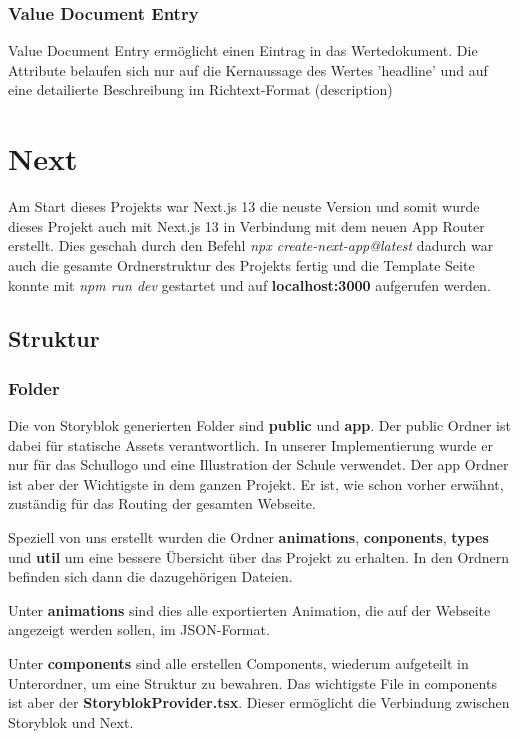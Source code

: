 \subsubsection*{Value Document Entry}
Value Document Entry ermöglicht einen Eintrag in das Wertedokument. Die Attribute belaufen sich nur auf die Kernaussage des Wertes 'headline' und auf eine detailierte Beschreibung im Richtext-Format (description) 

\section{Next}

Am Start dieses Projekts war Next.js 13 die neuste Version und somit wurde dieses Projekt auch mit Next.js 13 in Verbindung mit dem neuen App Router erstellt.
Dies geschah durch den Befehl \emph{npx create-next-app@latest} dadurch war auch die gesamte Ordnerstruktur des Projekts fertig und die Template Seite konnte mit \emph{npm run dev} gestartet und auf \textbf{localhost:3000} aufgerufen werden.

\subsection{Struktur}
\subsubsection*{Folder}
Die von Storyblok generierten Folder sind \textbf{public} und \textbf{app}. 
Der public Ordner ist dabei für statische Assets verantwortlich. In unserer Implementierung wurde er nur für das Schullogo und eine Illustration der Schule verwendet. 
Der app Ordner ist aber der Wichtigste in dem ganzen Projekt. Er ist, wie schon vorher erwähnt, zuständig für das Routing der gesamten Webseite. 


Speziell von uns erstellt wurden die Ordner \textbf{animations}, \textbf{conponents}, \textbf{types} und \textbf{util} um eine bessere Übersicht über das Projekt zu erhalten. 
In den Ordnern befinden sich dann die dazugehörigen Dateien.

Unter \textbf{animations} sind dies alle exportierten Animation, die auf der Webseite angezeigt werden sollen, im JSON-Format. 

Unter \textbf{components} sind alle erstellen Components, wiederum aufgeteilt in Unterordner, um eine Struktur zu bewahren. Das wichtigste File in components ist aber der \textbf{StoryblokProvider.tsx}. Dieser ermöglicht die Verbindung zwischen Storyblok und Next.

